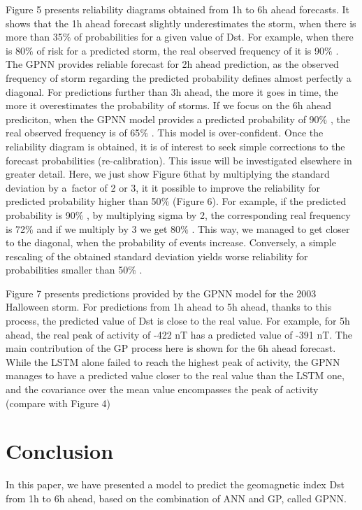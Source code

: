 Figure 5 presents reliability diagrams obtained from 1h to 6h ahead forecasts. It shows that the 1h ahead 
forecast slightly underestimates the storm, when there is more than 35$\%$  of probabilities for a 
given value of Dst. For example, when there is 80$\%$  of risk for a predicted storm, the real observed 
frequency of it is 90$\%$ . The GPNN provides reliable forecast for 2h ahead prediction, as the observed 
frequency of storm regarding the predicted probability defines almost perfectly a diagonal. For predictions 
further than 3h ahead, the more it goes in time, the more it overestimates the probability of storms. If we 
focus on the 6h ahead prediciton, when the GPNN model provides a predicted probability of 90$\%$ , the 
real observed frequency is of 65$\%$ . This model is over-confident. Once the reliability diagram is obtained, 
it is of interest to seek simple corrections to the forecast probabilities (re-calibration). This issue will be 
investigated elsewhere in greater detail. Here, we just show Figure 6that by multiplying the standard deviation 
by a\ factor of 2 or 3, it it possible to improve the reliability for predicted probability higher than 50$\%$  
(Figure 6). For example, if the predicted probability is 90$\%$ , by multiplying sigma by 2, the corresponding 
real frequency is 72$\%$  and if we multiply by 3 we get 80$\%$ . This way, we managed to get closer to the diagonal, 
when the probability of events increase. Conversely, a simple rescaling of the obtained standard deviation yields 
worse reliability for probabilities smaller than 50$\%$ .  


Figure 7 presents predictions provided by the GPNN model for the 2003 Halloween storm. For predictions from 
1h ahead to 5h ahead, thanks to this process, the predicted value of Dst is close to the real value. For example, 
for 5h ahead, the real peak of activity of -422 nT has a predicted value of -391 nT. The main contribution of the 
GP process here is shown for the 6h ahead forecast. While the LSTM alone failed to reach the highest peak of activity, 
the GPNN manages to have a predicted value closer to the real value than the LSTM one, and the covariance over the 
mean value encompasses the peak of activity (compare with Figure 4)



\section{Conclusion}


In this paper, we have presented a model to predict the geomagnetic index Dst from 1h to 6h ahead, 
based on the combination of ANN and GP, called GPNN. 

